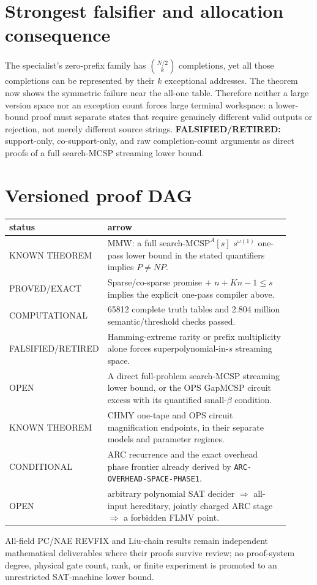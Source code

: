 \documentclass[11pt]{article}
\begin{document}
\section*{Strongest falsifier and allocation consequence}
The specialist's zero-prefix family has
$\binom{N/2}{k}$ completions, yet all those completions can be represented by
their $k$ exceptional addresses.  The theorem now shows the symmetric failure
near the all-one table.  Therefore neither a large version space nor an
exception count forces large terminal workspace: a lower-bound proof must
separate states that require genuinely different valid outputs or rejection,
not merely different source strings.  \textbf{FALSIFIED/RETIRED:} support-only,
co-support-only, and raw completion-count arguments as direct proofs of a
full search-MCSP streaming lower bound.

\section*{Versioned proof DAG}
\begin{center}
\begin{tabular}{p{0.18\linewidth}p{0.73\linewidth}}
\toprule
status & arrow\\
\midrule
KNOWN THEOREM & MMW: a full search-$\mathrm{MCSP}^A[s]$
$s^{\omega(1)}$ one-pass lower bound in the stated quantifiers implies
$P\ne NP$.\\
PROVED/EXACT & Sparse/co-sparse promise $+$ $n+Kn-1\le s$ implies the explicit
one-pass compiler above.\\
COMPUTATIONAL & 65812 complete truth tables and 2.804 million semantic/threshold
checks passed.\\
FALSIFIED/RETIRED & Hamming-extreme rarity or prefix multiplicity alone forces
superpolynomial-in-$s$ streaming space.\\
OPEN & A direct full-problem search-MCSP streaming lower bound, or the OPS
GapMCSP circuit excess with its quantified small-$\beta$ condition.\\
KNOWN THEOREM & CHMY one-tape and OPS circuit magnification endpoints, in
their separate models and parameter regimes.\\
CONDITIONAL & ARC recurrence and the exact overhead phase frontier already
derived by \texttt{ARC-OVERHEAD-SPACE-PHASE1}.\\
OPEN & arbitrary polynomial SAT decider $\Rightarrow$ all-input hereditary,
jointly charged ARC stage $\Rightarrow$ a forbidden FLMV point.\\
\bottomrule
\end{tabular}
\end{center}
All-field PC/NAE REVFIX and Liu-chain results remain independent mathematical
deliverables where their proofs survive review; no proof-system degree,
physical gate count, rank, or finite experiment is promoted to an unrestricted
SAT-machine lower bound.
\end{document}
